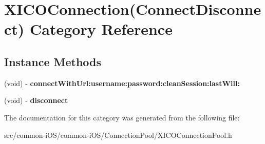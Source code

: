 \hypertarget{category_x_i_c_o_connection_07_connect_disconnect_08}{}\section{X\+I\+C\+O\+Connection(Connect\+Disconnect) Category Reference}
\label{category_x_i_c_o_connection_07_connect_disconnect_08}
\subsection*{Instance Methods}
\begin{DoxyCompactItemize}
\item 
\hypertarget{category_x_i_c_o_connection_07_connect_disconnect_08_a5badc7a081eb031c4cc51eb72b9fc73a}{}\label{category_x_i_c_o_connection_07_connect_disconnect_08_a5badc7a081eb031c4cc51eb72b9fc73a} 
(void) -\/ {\bfseries connect\+With\+Url\+:username\+:password\+:clean\+Session\+:last\+Will\+:}
\item 
\hypertarget{category_x_i_c_o_connection_07_connect_disconnect_08_ac939c5e9b891673f755fe49d43f5a9b4}{}\label{category_x_i_c_o_connection_07_connect_disconnect_08_ac939c5e9b891673f755fe49d43f5a9b4} 
(void) -\/ {\bfseries disconnect}
\end{DoxyCompactItemize}


The documentation for this category was generated from the following file\+:\begin{DoxyCompactItemize}
\item 
src/common-\/i\+O\+S/common-\/i\+O\+S/\+Connection\+Pool/X\+I\+C\+O\+Connection\+Pool.\+h\end{DoxyCompactItemize}
